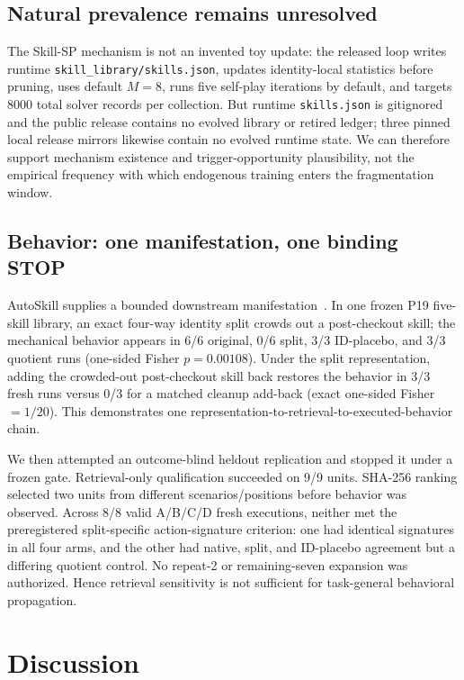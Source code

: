 \subsection{Natural prevalence remains unresolved}

The Skill-SP mechanism is not an invented toy update: the released loop writes runtime \texttt{skill\_library/skills.json}, updates identity-local statistics before pruning, uses default $M=8$, runs five self-play iterations by default, and targets 8000 total solver records per collection. But runtime \texttt{skills.json} is gitignored and the public release contains no evolved library or retired ledger; three pinned local release mirrors likewise contain no evolved runtime state. We can therefore support mechanism existence and trigger-opportunity plausibility, not the empirical frequency with which endogenous training enters the fragmentation window.

\subsection{Behavior: one manifestation, one binding STOP}

AutoSkill supplies a bounded downstream manifestation~\citep{yang2026autoskill}. In one frozen P19 five-skill library, an exact four-way identity split crowds out a post-checkout skill; the mechanical behavior appears in 6/6 original, 0/6 split, 3/3 ID-placebo, and 3/3 quotient runs (one-sided Fisher $p=0.00108$). Under the split representation, adding the crowded-out post-checkout skill back restores the behavior in 3/3 fresh runs versus 0/3 for a matched cleanup add-back (exact one-sided Fisher $=1/20$). This demonstrates one representation-to-retrieval-to-executed-behavior chain.

We then attempted an outcome-blind heldout replication and stopped it under a frozen gate. Retrieval-only qualification succeeded on 9/9 units. SHA-256 ranking selected two units from different scenarios/positions before behavior was observed. Across 8/8 valid A/B/C/D fresh executions, neither met the preregistered split-specific action-signature criterion: one had identical signatures in all four arms, and the other had native, split, and ID-placebo agreement but a differing quotient control. No repeat-2 or remaining-seven expansion was authorized. Hence retrieval sensitivity is not sufficient for task-general behavioral propagation.

\section{Discussion}

